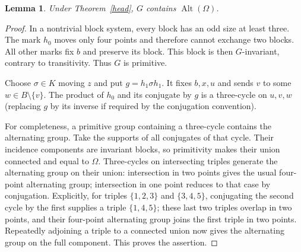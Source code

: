 \documentclass[11pt,a4paper]{article}
\newtheorem{lemma}{Lemma}
\begin{document}
\begin{lemma}\label{alternating}
Under Theorem~\ref{head}, $G$ contains $\operatorname{Alt}(\Omega)$.
\end{lemma}
\begin{proof}
In a nontrivial block system, every block has an odd size at least
three. The mark $h_0$ moves only four points and therefore cannot
exchange two blocks. All other marks fix $b$ and preserve its
block. This block is then $G$-invariant, contrary to transitivity.
Thus $G$ is primitive.

Choose $\sigma\in K$ moving $z$ and put $g=h_1\sigma h_1$.
It fixes $b,x,u$ and sends $v$ to some $w\in B\setminus\{v\}$.
The product of $h_0$ and its conjugate by $g$ is a three-cycle
on $u,v,w$ (replacing $g$ by its inverse if required by the
conjugation convention).

For completeness, a primitive group containing a three-cycle
contains the alternating group. Take the supports of all conjugates
of that cycle. Their incidence components are invariant blocks,
so primitivity makes their union connected and equal to $\Omega$.
Three-cycles on intersecting triples generate the alternating group
on their union: intersection in two points gives the usual four-point
alternating group; intersection in one point reduces to that case
by conjugation. Explicitly, for triples $\{1,2,3\}$ and $\{3,4,5\}$,
conjugating the second cycle by the first supplies a triple
$\{1,4,5\}$; these last two triples overlap in two points, and
their four-point alternating group joins the first triple in two
points. Repeatedly adjoining a triple to a connected union now gives
the alternating group on the full component. This proves the assertion.
\end{proof}
\end{document}
